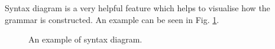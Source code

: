 Syntax diagram is a very helpful feature which helps to visualise how the grammar is constructed. An example can be seen in Fig. \ref{fig:grammarSyntaxDiagram}.

\begin{figure}[hbt!]
    \centering
    \caption{An example of syntax diagram.}
    \label{fig:grammarSyntaxDiagram}
\end{figure}
